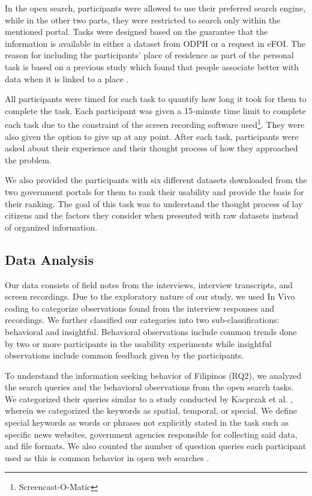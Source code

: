 \documentclass{sigchi}
\begin{document}
In the open search, participants were allowed to use their preferred search engine, while in the other two parts, they were restricted to search only within the mentioned portal. Tasks were designed based on the guarantee that the information is available in either a dataset from ODPH or a request in eFOI. The reason for including the participants' place of residence as part of the personal task is based on a previous study which found that people associate better with data when it is linked to a place \cite{Puussaar2018}.


All participants were timed for each task to quantify how long it took for them to complete the task. Each participant was given a 15-minute time limit to complete each task due to the constraint of the screen recording software used\footnote{Screencast-O-Matic}. They were also given the option to give up at any point. After each task, participants were asked about their experience and their thought process of how they approached the problem.

We also provided the participants with six different datasets downloaded from the two government portals for them to rank their usability and provide the basis for their ranking. The goal of this task was to understand the thought process of lay citizens and the factors they consider when presented with raw datasets instead of organized information. 

\subsection{Data Analysis}
Our data consists of field notes from the interviews, interview transcripts, and screen recordings. Due to the exploratory nature of our study, we used In Vivo coding to categorize observations found from the interview responses and recordings. We further classified our categories into two sub-classifications: behavioral and insightful. Behavioral observations include common trends done by two or more participants in the usability experiments while insightful observations include common feedback given by the participants. 

To understand the information seeking behavior of Filipinos (RQ2), we analyzed the search queries and the behavioral observations from the open search tasks. We categorized their queries similar to a study conducted by Kacprzak et al. \cite{kacprzak2019characterising}, wherein we categorized the keywords as spatial, temporal, or special. We define special keywords as words or phrases not explicitly stated in the task such as specific news websites, government agencies responsible for collecting said data, and file formats. We also counted the number of question queries each participant used as this is common behavior in open web searches \cite{White2015}.
\end{document}
